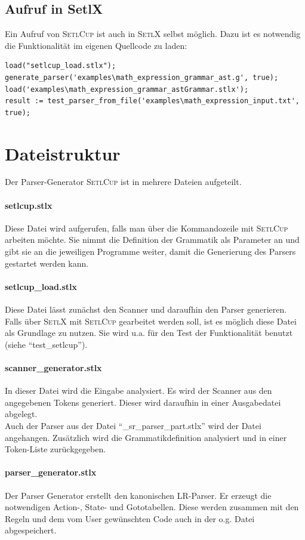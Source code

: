 \subsection{Aufruf in SetlX}
Ein Aufruf von \textsc{SetlCup} ist auch in \textsc{SetlX} selbst möglich. Dazu ist es notwendig die Funktionalität im eigenen Quellcode zu laden:
\begin{Verbatim}
load("setlcup_load.stlx");
generate_parser('examples\math_expression_grammar_ast.g', true);
load('examples\math_expression_grammar_astGrammar.stlx');
result := test_parser_from_file('examples\math_expression_input.txt', true);
\end{Verbatim}
\section{Dateistruktur}
Der Parser-Generator \textsc{SetlCup} ist in mehrere Dateien aufgeteilt.
\paragraph{setlcup.stlx} Diese Datei wird aufgerufen, falls man über die Kommandozeile mit \textsc{SetlCup} arbeiten möchte. Sie nimmt die Definition der Grammatik als Parameter an und gibt sie an die jeweiligen Programme weiter, damit die Generierung des Parsers gestartet werden kann.
\paragraph{setlcup\_load.stlx} Diese Datei lässt zunächst den Scanner und daraufhin den Parser generieren. Falls über \textsc{SetlX} mit \textsc{SetlCup} gearbeitet werden soll, ist es möglich diese Datei als Grundlage zu nutzen. Sie wird u.a. für den Test der Funktionalität benutzt (siehe "`test\_setlcup"').
\paragraph{scanner\_generator.stlx} In dieser Datei wird die Eingabe analysiert. Es wird der Scanner aus den angegebenen Tokens generiert. Dieser wird daraufhin in einer Ausgabedatei abgelegt. \\
Auch der Parser aus der Datei "`\_sr\_parser\_part.stlx"' wird der Datei angehangen. Zusätzlich wird die Grammatikdefinition analysiert und  in einer Token-Liste zurückgegeben.
\paragraph{parser\_generator.stlx} Der Parser Generator erstellt den kanonischen LR-Parser. Er erzeugt die notwendigen Action-, State- und Gototabellen. Diese werden zusammen mit den Regeln und dem vom User gewünschten Code auch in der o.g. Datei abgespeichert. 
